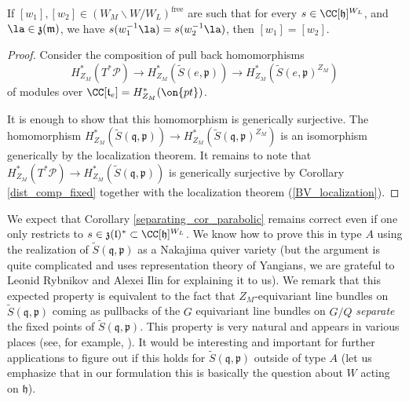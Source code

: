 \documentclass[12pt]{amsart}
\begin{document}
\begin{cor}\label{separating_cor_parabolic}
If $[w_1], [w_2] \in (W_M\backslash W/W_L)^{\mathrm{free}}$ are such that for every $s \in \CC[\mathfrak{h}]^{W_L}$, and $\la \in \mathfrak{z}(\mathfrak{m})$, we have $s(w_1^{-1}\la)=s(w_2^{-1}\la)$, then $[w_1] = [w_2]$.
\end{cor}
\begin{proof}
Consider the composition of pull back homomorphisms 
\begin{equation*}
H^*_{Z_M}(T^*\mathcal{P}) \rightarrow H^*_{Z_M}(\widetilde{S}(e,\mathfrak{p})) \rightarrow H^*_{Z_M}(\widetilde{S}(e,\mathfrak{p})^{Z_M})
\end{equation*}
of modules over $\CC[\mathfrak{t}_e]=H^*_{Z_M}(\on{pt})$.

It is enough to show that this homomorphism is generically surjective. The homomorphism $H^*_{Z_M}(\widetilde{S}(\mathfrak{q},\mathfrak{p})) \rightarrow H^*_{Z_M}(\widetilde{S}(\mathfrak{q},\mathfrak{p})^{Z_M})$ is an isomorphism generically  by the localization theorem. It remains to note that $H^*_{Z_M}(T^*\mathcal{P}) \rightarrow H^*_{Z_M}(\widetilde{S}(\mathfrak{q},\mathfrak{p}))$ is generically surjective by Corollary \ref{dist_comp_fixed} together with the localization theorem (\ref{BV_localization}).
\end{proof}



\begin{rmk}
We expect that Corollary \ref{separating_cor_parabolic} remains correct even if one only restricts to $s \in \mathfrak{z}(\mathfrak{l})^* \subset \CC[\mathfrak{h}]^{W_L}$. We know how to prove this in type $A$ using the realization of $\widetilde{S}(\mathfrak{q},\mathfrak{p})$ as a Nakajima quiver variety (but the argument is quite complicated and uses representation theory of Yangians, we are grateful to Leonid Rybnikov and Alexei Ilin for explaining it to us). We remark that this expected property is equivalent to the fact that $Z_M$-equivariant line bundles on $\widetilde{S}(\mathfrak{q},\mathfrak{p})$ coming as pullbacks of the $G$ equivariant line bundles on $G/Q$ {\emph{separate}} the fixed points of $\widetilde{S}(\mathfrak{q},\mathfrak{p})$. This property is very natural and appears in various places (see, for example, \cite[``Important Assumptions'' after Theorem 2.6]{quantum_K_theory}). It would be interesting and important for further applications to figure out if this holds for $\widetilde{S}(\mathfrak{q},\mathfrak{p})$ outside of type $A$ (let us emphasize that in our formulation this is basically the question about $W$ acting on $\mathfrak{h}$).
\end{rmk}
\end{document}
